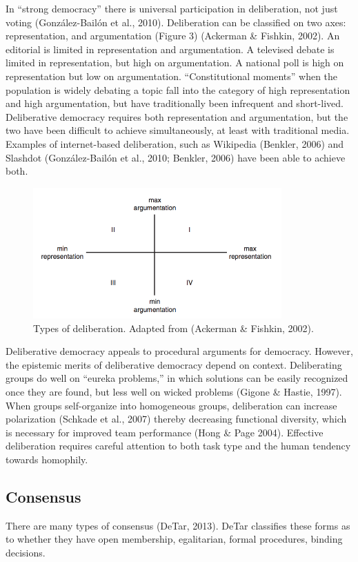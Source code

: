 In ``strong democracy'' there is universal participation in deliberation, not just voting (Gonz\'alez-Bail\'on et al., 2010). Deliberation can be classified on two axes: representation, and argumentation (Figure 3) (Ackerman \& Fishkin, 2002). An editorial is limited in representation and argumentation. A televised debate is limited in representation, but high on argumentation. A national poll is high on representation but low on argumentation. ``Constitutional moments'' when the population is widely debating a topic fall into the category of high representation and high argumentation, but have traditionally been infrequent and short-lived. Deliberative democracy requires both representation and argumentation, but the two have been difficult to achieve simultaneously, at least with traditional media. Examples of internet-based deliberation, such as Wikipedia (Benkler, 2006) and Slashdot (Gonz\'alez-Bail\'on et al., 2010; Benkler, 2006) have been able to achieve both.

\begin{figure}
\centering
\includegraphics[width=3.75in]{images/fig-deliberation.png}
\caption{Types of deliberation. Adapted from (Ackerman \& Fishkin, 2002).\label{fig:deliberation}}
\end{figure}

Deliberative democracy appeals to procedural arguments for democracy. However, the epistemic merits of deliberative democracy depend on context. Deliberating groups do well on ``eureka problems,'' in which solutions can be easily recognized once they are found, but less well on wicked problems (Gigone \& Hastie, 1997). When groups self-organize into homogeneous groups, deliberation can increase polarization (Schkade et al., 2007) thereby decreasing functional diversity, which is necessary for improved team performance (Hong \& Page 2004). Effective deliberation requires careful attention to both task type and the human tendency towards homophily.

\subsection{Consensus}
There are many types of consensus (DeTar, 2013). DeTar classifies these forms as to whether they have open membership, egalitarian, formal procedures, binding decisions.

